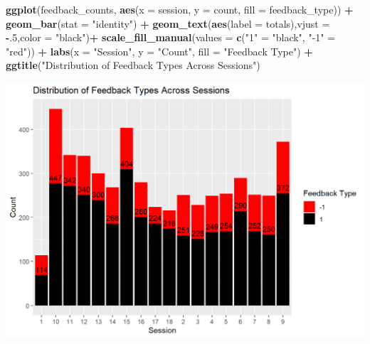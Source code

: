\documentclass[
]{article}
\newenvironment{Shaded}{\begin{snugshade}}{\end{snugshade}}
\newcommand{\AttributeTok}[1]{\textcolor[rgb]{0.13,0.29,0.53}{#1}}
\newcommand{\DecValTok}[1]{\textcolor[rgb]{0.00,0.00,0.81}{#1}}
\newcommand{\FunctionTok}[1]{\textcolor[rgb]{0.13,0.29,0.53}{\textbf{#1}}}
\newcommand{\NormalTok}[1]{#1}
\newcommand{\OtherTok}[1]{\textcolor[rgb]{0.56,0.35,0.01}{#1}}
\newcommand{\SpecialCharTok}[1]{\textcolor[rgb]{0.81,0.36,0.00}{\textbf{#1}}}
\newcommand{\StringTok}[1]{\textcolor[rgb]{0.31,0.60,0.02}{#1}}
\begin{document}
\begin{Shaded}
\begin{Highlighting}[]
\FunctionTok{ggplot}\NormalTok{(feedback\_counts, }\FunctionTok{aes}\NormalTok{(}\AttributeTok{x =}\NormalTok{ session, }\AttributeTok{y =}\NormalTok{ count, }\AttributeTok{fill =}\NormalTok{ feedback\_type)) }\SpecialCharTok{+}
  \FunctionTok{geom\_bar}\NormalTok{(}\AttributeTok{stat =} \StringTok{"identity"}\NormalTok{) }\SpecialCharTok{+} \FunctionTok{geom\_text}\NormalTok{(}\FunctionTok{aes}\NormalTok{(}\AttributeTok{label =}\NormalTok{ totals),}\AttributeTok{vjust =} \SpecialCharTok{{-}}\NormalTok{.}\DecValTok{5}\NormalTok{,}\AttributeTok{color =} \StringTok{"black"}\NormalTok{)}\SpecialCharTok{+} \FunctionTok{scale\_fill\_manual}\NormalTok{(}\AttributeTok{values =} \FunctionTok{c}\NormalTok{(}\StringTok{"1"} \OtherTok{=} \StringTok{"black"}\NormalTok{, }\StringTok{"{-}1"} \OtherTok{=} \StringTok{"red"}\NormalTok{)) }\SpecialCharTok{+} \FunctionTok{labs}\NormalTok{(}\AttributeTok{x =} \StringTok{"Session"}\NormalTok{, }\AttributeTok{y =} \StringTok{"Count"}\NormalTok{, }\AttributeTok{fill =} \StringTok{"Feedback Type"}\NormalTok{) }\SpecialCharTok{+} \FunctionTok{ggtitle}\NormalTok{(}\StringTok{"Distribution of Feedback Types Across Sessions"}\NormalTok{)}
\end{Highlighting}
\end{Shaded}

\includegraphics{images/unnamed-chunk-9-1.png}
\end{document}
